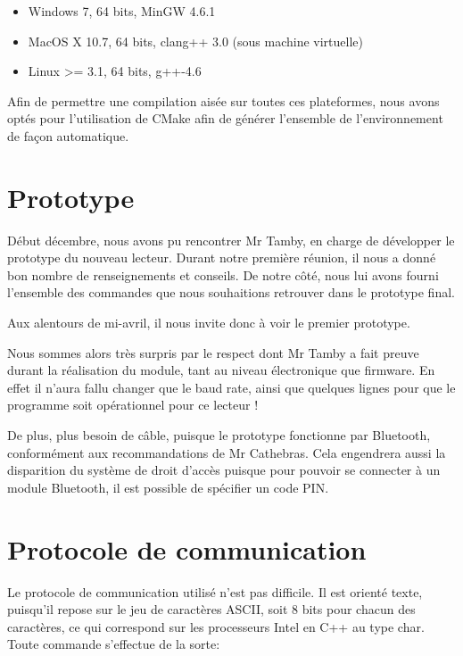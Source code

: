     \begin{itemize}
    \item Windows 7, 64 bits, MinGW 4.6.1
    \item MacOS X 10.7, 64 bits, clang++ 3.0 (sous machine virtuelle)
    \item Linux >= 3.1, 64 bits, g++-4.6
    \end{itemize}

Afin de permettre une compilation aisée sur toutes ces plateformes, nous avons
optés pour l'utilisation de CMake afin de générer l'ensemble de l'environnement de
façon automatique.

    \section{Prototype}

Début décembre, nous avons pu rencontrer Mr Tamby, en charge de développer le
prototype du nouveau lecteur. Durant notre première réunion, il nous a donné
bon nombre de renseignements et conseils. De notre côté, nous lui avons fourni
l'ensemble des commandes que nous souhaitions retrouver dans le prototype final.

Aux alentours de mi-avril, il nous invite donc à voir le premier prototype.


Nous sommes alors très surpris par le respect dont Mr Tamby a fait preuve
durant la réalisation du module, tant au niveau électronique que firmware.
En effet il n'aura fallu changer que le baud rate, ainsi que quelques lignes
pour que le programme soit opérationnel pour ce lecteur !

De plus, plus besoin de câble, puisque le prototype fonctionne par Bluetooth,
conformément aux recommandations de Mr Cathebras. Cela engendrera aussi la disparition
du système de droit d'accès puisque pour pouvoir se connecter à un module Bluetooth,
il est possible de spécifier un code PIN.

    \section{Protocole de communication}

Le protocole de communication utilisé n'est pas difficile. Il est orienté 
texte, puisqu'il repose sur le jeu de caractères ASCII, soit 8 bits pour chacun des
caractères, ce qui correspond sur les processeurs Intel en C++ au type char. 
Toute commande s'effectue de la sorte:

